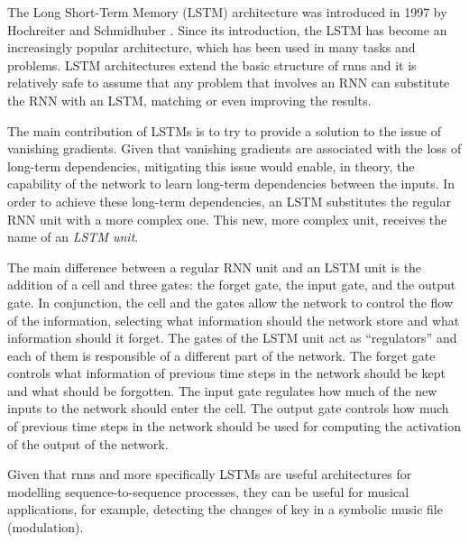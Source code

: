 

The Long Short-Term Memory (LSTM) architecture was
introduced in 1997 by Hochreiter and Schmidhuber
\parencite{hochreiter1997long}. Since its introduction, the
LSTM has become an increasingly popular architecture, which
has been used in many tasks and problems. LSTM architectures
extend the basic structure of \glspl{rnn} and it is relatively safe
to assume that any problem that involves an RNN can
substitute the RNN with an LSTM, matching or even improving
the results.

The main contribution of LSTMs is to try to provide a
solution to the issue of vanishing gradients. Given that
vanishing gradients are associated with the loss of
long-term dependencies, mitigating this issue would enable,
in theory, the capability of the network to learn long-term
dependencies between the inputs. In order to achieve these
long-term dependencies, an LSTM substitutes the regular RNN
unit with a more complex one. This new, more complex unit,
receives the name of an \emph{LSTM unit}.

The main difference between a regular RNN unit and an LSTM
unit is the addition of a cell and three gates: the forget
gate, the input gate, and the output gate. In conjunction,
the cell and the gates allow the network to control the flow
of the information, selecting what information should the
network store and what information should it forget. The
gates of the LSTM unit act as ``regulators'' and each of
them is responsible of a different part of the network. The
forget gate controls what information of previous time steps
in the network should be kept and what should be forgotten.
The input gate regulates how much of the new inputs to the
network should enter the cell. The output gate controls how
much of previous time steps in the network should be used
for computing the activation of the output of the network.

Given that \glspl{rnn} and more specifically LSTMs are useful
architectures for modelling sequence-to-sequence processes,
they can be useful for musical applications, for example,
detecting the changes of key in a symbolic music file
(modulation).


